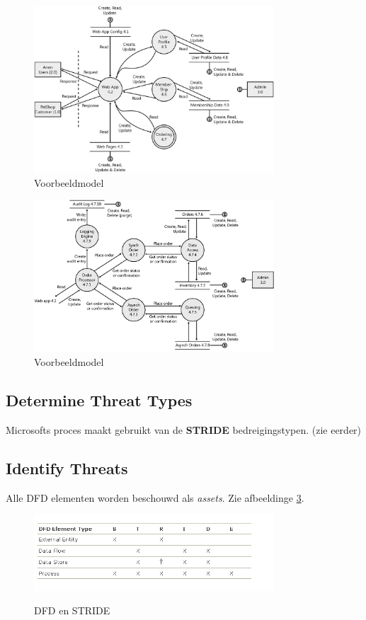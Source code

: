 \documentclass[../main.tex]{subfiles}
\begin{document}
\begin{figure}[h!]
    \centering
    \includegraphics[width=0.8\textwidth]{../images/pet_shop_model_2.png}
    \caption{Voorbeeldmodel}
    \label{example2}
\end{figure}

\begin{figure}[h!]
    \centering
    \includegraphics[width=0.8\textwidth]{../images/pet_shop_model_3.png}
    \caption{Voorbeeldmodel}
    \label{example3}
\end{figure}

\subsection{Determine Threat Types}
Microsofts proces maakt gebruikt van de  \textbf{STRIDE} bedreigingstypen. (zie eerder) 
\subsection{Identify Threats}
Alle DFD elementen worden beschouwd als \textit{assets}. Zie afbeeldinge \ref{STRIDE}.
\begin{figure}[h!]
    \centering
    \includegraphics[width=0.8\textwidth]{../images/STRIDE.png}
    \label{STRIDE}
    \caption{DFD en STRIDE}
\end{figure}
\end{document}
